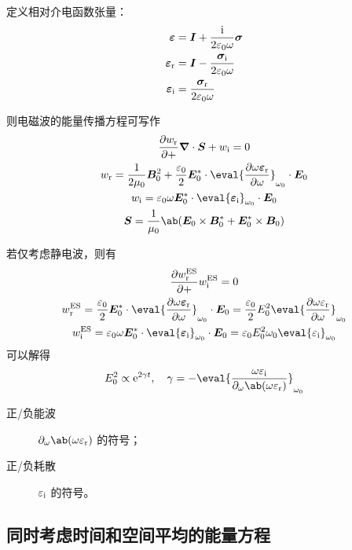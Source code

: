 定义相对介电函数张量：
\begin{subequations}\begin{align}
\bm{\varepsilon} &= \bm{I} + \frac{\mathrm{i}}{2\varepsilon_0 \omega} \bm{\sigma} \\
\bm{\varepsilon}_{\mathrm{r}} &= \bm{I} - \frac{\bm{\sigma}_{\mathrm{i}}}{2\varepsilon_0 \omega} \\
\bm{\varepsilon}_{\mathrm{i}} &= \frac{\bm{\sigma}_{\mathrm{r}}}{2\varepsilon_0 \omega} \\
\end{align}\end{subequations}

则电磁波的能量传播方程可写作
\begin{subequations}\begin{gather}
\pdv{w_\re} + \dive{\vec{S}} + w_\im = 0 \\
w_\re = \frac{1}{2\mu_0} \vec{B}_0^2
    + \frac{\varepsilon_0}{2} \vec{E}_0^*
        \cdot \eval{\pdv{\omega \vec{\varepsilon}_\re}{\omega}}_{\omega_0}
        \cdot \vec{E}_0 \\
w_\im = \varepsilon_0 \omega \vec{E}_0^*
        \cdot \eval{\vec{\varepsilon}_\im}_{\omega_0}
        \cdot \vec{E}_0 \\
\vec{S} = \frac{1}{\mu_0} \ab(
    \vec{E}_0 \times \vec{B}_0^*
    + \vec{E}_0^* \times \vec{B}_0
)
\end{gather}\end{subequations}

若仅考虑静电波，则有
\begin{subequations}\begin{gather}
\pdv{w^\text{ES}_\re} + w^\text{ES}_\im = 0 \\
w^\text{ES}_\re = \frac{\varepsilon_0}{2} \vec{E}_0^*
        \cdot \eval{\pdv{\omega \vec{\varepsilon}_\re}{\omega}}_{\omega_0}
        \cdot \vec{E}_0
= \frac{\varepsilon_0}{2} E_0^2 \eval{\pdv{\omega \varepsilon_\re}{\omega}}_{\omega_0 }\\
w^\text{ES}_\im = \varepsilon_0 \omega \vec{E}_0^*
        \cdot \eval{\vec{\varepsilon}_\im}_{\omega_0}
        \cdot \vec{E}_0
= \varepsilon_0 E_0^2 \omega_0 \eval{\varepsilon_\im}_{\omega_0}
\end{gather}\end{subequations}
可以解得
\begin{equation}
E_0^2 \propto \eu^{2 \gamma t}, \quad
\gamma = - \eval{\frac{\omega \varepsilon_\im}{
    \pdv{\ab(\omega \varepsilon_\re)}!{\omega}
}}_{\omega_0}
\end{equation}

\begin{description}
    \item[正/负能波] $\pdv{\ab(\omega \varepsilon_\re)}!{\omega}$ 的符号；
    \item[正/负耗散] $\varepsilon_{\mathrm{i}}$ 的符号。
\end{description}

\subsection{同时考虑时间和空间平均的能量方程}
